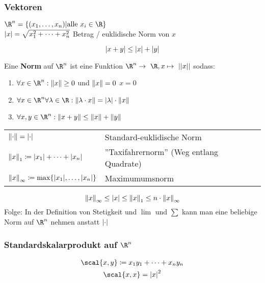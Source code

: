 \subsubsection{Vektoren}
$\R^n = \{ (x_1 , \dotsc , x_n) | \text{alle } x_i \in \R \}$\\
$\abs{x} = \sqrt{x_1^2 + \dots + x_n^2}$ Betrag / euklidische Norm von $x$\\
\begin{satz*}[note = Dreiecksungleichung]
	\[ \abs{x+y} \leq \abs{x} + \abs{y} \]
\end{satz*}
\begin{def*}[note = Norm , index = Norm]
	Eine \textbf{Norm} auf $\R^n$ ist eine Funktion $\R^n \rightarrow \R , x \mapsto ||x||$ sodass:
	\begin{enumerate}
		\item $\forall x \in \R^n : \norm{x} \geq 0$ und $\norm{x} = 0$ \gdw $x=0$
		\item $\forall x \in \R^n \forall \lambda \in \R: \norm{\lambda \cdot x} = \abs{\lambda} \cdot \norm{x}$
		\item $\forall x , y \in \R^n : \norm{x + y} \leq \norm{x} + \norm{y}$
	\end{enumerate}
\end{def*}
\begin{bsp*}
	\begin{tabular}{ll}
		$\norm{\cdot} = \abs{\cdot}$								&Standard-euklidische Norm			\\
		$\norm{x}_1 \coloneqq \abs{x_1} + \dots + \abs{x_n}$				&''Taxifahrernorm'' (Weg entlang Quadrate)	\\
		$\norm{x}_\infty \coloneqq \max\{ \abs{x_1}, \dotsc , \abs{x_n} \}$	&Maximumumsnorm					
	\end{tabular}
\end{bsp*}
\begin{fakt}
	\[ \norm{x}_{\infty} \leq \abs{x} \leq \norm{x}_1 \leq n \cdot \norm{x}_{\infty} \]
	Folge: In der Definition von Stetigkeit und $\lim$ und $\sum$ kann man eine beliebige Norm auf $\R^n$ nehmen anstatt $\abs{\cdot}$
\end{fakt}

\subsubsection{Standardskalarprodukt auf \texorpdfstring{$\R^n$}{R^n}}
\begin{gather*}
	\scal{x,y} \coloneqq x_1 y_1 + \dots + x_n y_n \\
	\scal{x,x} = \abs{x}^2
\end{gather*}
